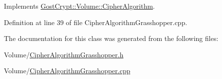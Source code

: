 Implements \hyperlink{class_gost_crypt_1_1_volume_1_1_cipher_algorithm_a1be05f68ce3c18e7cd76708739f3f85a}{Gost\+Crypt\+::\+Volume\+::\+Cipher\+Algorithm}.



Definition at line 39 of file Cipher\+Algorithm\+Grasshopper.\+cpp.



The documentation for this class was generated from the following files\+:\begin{DoxyCompactItemize}
\item 
Volume/\hyperlink{_cipher_algorithm_grasshopper_8h}{Cipher\+Algorithm\+Grasshopper.\+h}\item 
Volume/\hyperlink{_cipher_algorithm_grasshopper_8cpp}{Cipher\+Algorithm\+Grasshopper.\+cpp}\end{DoxyCompactItemize}
